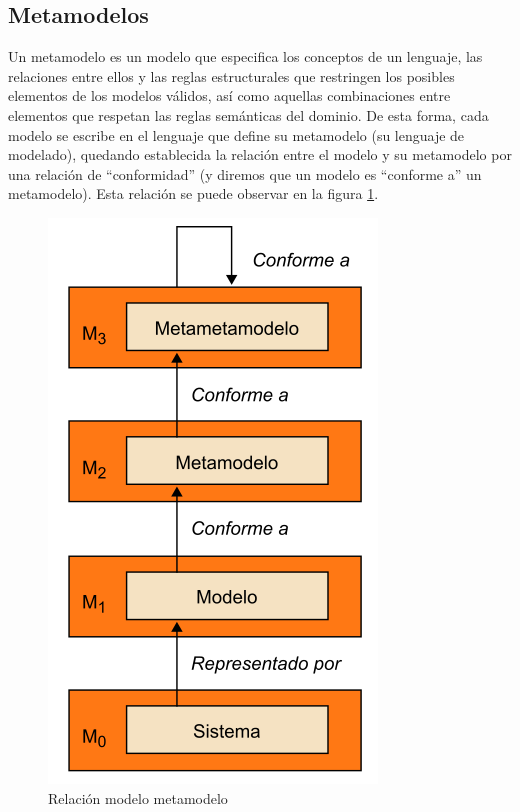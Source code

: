 \subsection{Metamodelos}
\label{Metamodelos}

Un metamodelo es un modelo que especifica los conceptos de un lenguaje, las relaciones entre ellos y las reglas estructurales que restringen los posibles elementos de los modelos válidos, así como aquellas combinaciones entre elementos que respetan las reglas semánticas del dominio.
De esta forma, cada modelo se escribe en el lenguaje que define su metamodelo (su lenguaje de modelado), quedando establecida la relación entre el modelo y su metamodelo por una relación de “conformidad” (y diremos que un modelo es “conforme a” un metamodelo). Esta relación se puede observar en la figura \ref{fig:Relación modelo metamodelo}.

\begin{figure}[!h] 
	\begin{center}
		\includegraphics [scale=0.40]{imagenes/Relacion_modelo_metamodelo.png}
	\end{center}
	\caption{Relación modelo metamodelo}
	\label{fig:Relación modelo metamodelo}
\end{figure} 

